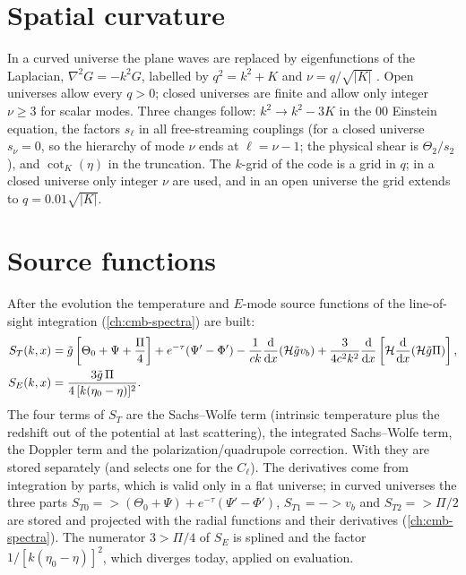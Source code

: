 \section{Spatial curvature}\label{sec:pert-curvature}

In a curved universe the plane waves are replaced by eigenfunctions of the Laplacian, $\nabla^2G=-k^2G$, labelled by
$q^2=k^2+K$ and $\nu=q/\sqrt{|K|}$ \cite{HuSeljak1998,LesgourguesTram2014}. Open universes allow every $q>0$; closed
universes are finite and allow only integer $\nu\ge3$ for scalar modes. Three changes follow: $k^2\to k^2-3K$ in the
$00$ Einstein equation, the factors $s_\ell$ in all free-streaming couplings (for a closed universe $s_\nu=0$, so the
hierarchy of mode $\nu$ ends at $\ell=\nu-1$; the physical shear is $\Theta_2/s_2$), and $\cot_K(\eta)$ in the
truncation. The $k$-grid of the code is a grid in $q$; in a closed universe only integer $\nu$ are used, and in an open
universe the grid extends to $q=0.01\sqrt{|K|}$.

\section{Source functions}\label{sec:pert-sources}

After the evolution the temperature and $E$-mode source functions of the line-of-sight integration
(\cref{ch:cmb-spectra}) are built:
\begin{align}
S_T(k,x)&=\tilde g\left[\Theta_0+\Psi+\frac\Pi4\right]+e^{-\tau}(\Psi'-\Phi')-\frac{1}{ck}\frac{\mathrm{d}}{\mathrm{d} x}(\mathcal{H}\tilde g v_b)
+\frac{3}{4c^2k^2}\frac{\mathrm{d}}{\mathrm{d} x}\left[\mathcal{H}\frac{\mathrm{d}}{\mathrm{d} x}(\mathcal{H}\tilde g\Pi)\right],\label{eq:pert-ST}\\
S_E(k,x)&=\frac{3\tilde g\,\Pi}{4\,[k(\eta_0-\eta)]^2}.\label{eq:pert-SE}
\end{align}
The four terms of $S_T$ are the Sachs--Wolfe term (intrinsic temperature plus the redshift out of the potential at
last scattering), the integrated Sachs--Wolfe term, the Doppler term and the polarization/quadrupole correction. With
 they are stored separately (and  selects one for the
$C_\ell$). The derivatives come from integration by parts, which is valid only in a flat universe; in curved
universes the three parts $S_{T0}=\gt(\Theta_0+\Psi)+e^{-\tau}(\Psi'-\Phi')$, $S_{T1}=-\gt v_b$ and $S_{T2}=\gt\Pi/2$
are stored and projected with the radial functions and their derivatives (\cref{ch:cmb-spectra}). The numerator
$3\gt\Pi/4$ of $S_E$ is splined and the factor $1/[k(\eta_0-\eta)]^2$, which diverges today, applied on evaluation.

